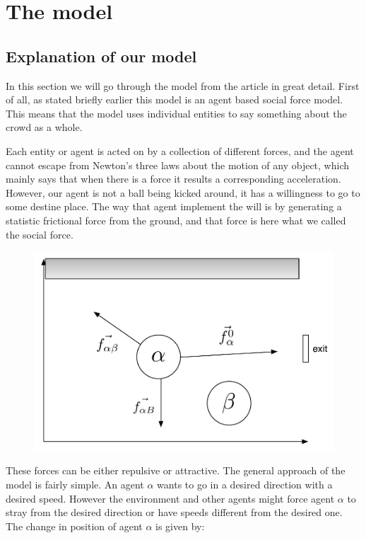 \section{The model}
\label{sec:the-model}


\subsection{Explanation of our model}
In this section we will go through the model from the article \cite{self-org} in great detail. 
First of all,  as stated briefly earlier this model is an agent based social force model. 
This means that the model uses individual entities to say something about the crowd as a whole. 

Each entity or agent is acted on by a collection of different forces, and the agent cannot escape 
from Newton's three laws about the motion of any object, which mainly says that when there is a 
force it results a corresponding acceleration.  However, our agent is not a ball being kicked around, 
it has a willingness to go to some destine place.  The way that agent implement the will is by 
generating a statistic frictional force from the ground, and that force is here what we called 
the social force.

\begin{figure}[hb]
    \centering
    {\includegraphics[scale=0.45]{Figures/ForceModel.pdf}} 
    \caption{}
    \label{ForceModel}
\end{figure}

These forces can be either repulsive or attractive. The general approach of the model 
is fairly simple. An agent $\alpha$ wants to go in a desired direction with a desired speed. 
However the environment and other agents might force agent $\alpha$ to stray from the desired 
direction or have speeds different from the desired one. The change in position of 
agent $\alpha$ is given by:

